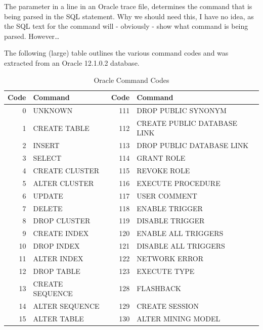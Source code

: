 \begin{appendix}
The  parameter in a  line in an Oracle
trace file, determines the command that is being parsed in the SQL
statement. Why we should need this, I have no idea, as the SQL text for the
command will - obviously - show what command is being parsed. However\ldots{}

The following (large) table outlines the various command codes and was extracted
from an Oracle 12.1.0.2 database.

\begin{longtable}[]{@{}rl|rl@{}}
\toprule
Code & Command & Code & Command  \\
\midrule
\endhead
\bottomrule
\caption{Oracle Command Codes\ldots{}\textit{continues on next page}}
\endfoot
\caption{Oracle Command Codes}
\endlastfoot

0    & UNKNOWN                      & 111 & DROP PUBLIC SYNONYM          \\
1    & CREATE TABLE                 & 112 & CREATE PUBLIC DATABASE LINK  \\
2    & INSERT                       & 113 & DROP PUBLIC DATABASE LINK    \\
3    & SELECT                       & 114 & GRANT ROLE                   \\
4    & CREATE CLUSTER               & 115 & REVOKE ROLE                  \\      
5    & ALTER CLUSTER                & 116 & EXECUTE PROCEDURE            \\
6    & UPDATE                       & 117 & USER COMMENT                 \\
7    & DELETE                       & 118 & ENABLE TRIGGER               \\
8    & DROP CLUSTER                 & 119 & DISABLE TRIGGER              \\
9    & CREATE INDEX                 & 120 & ENABLE ALL TRIGGERS          \\
10   & DROP INDEX                   & 121 & DISABLE ALL TRIGGERS         \\
11   & ALTER INDEX                  & 122 & NETWORK ERROR                \\
12   & DROP TABLE                   & 123 & EXECUTE TYPE                 \\
13   & CREATE SEQUENCE              & 128 & FLASHBACK                    \\
14   & ALTER SEQUENCE               & 129 & CREATE SESSION               \\
15   & ALTER TABLE                  & 130 & ALTER MINING MODEL           \\

\end{longtable}
\end{appendix}

